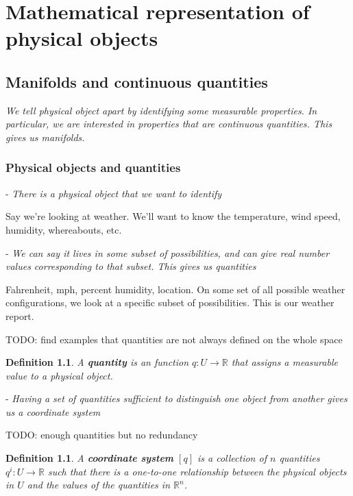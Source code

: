 \documentclass{book}
\newtheorem{defn}[equation]{Definition}
\begin{document}
\tableofcontents

\chapter{Mathematical representation of physical objects}



\section{Manifolds and continuous quantities}
\emph{We tell physical object apart by identifying some measurable properties. In particular, we are interested in properties that are continuous quantities. This gives us manifolds.}

\subsection{Physical objects and quantities}

- \emph{There is a physical object that we want to identify}

Say we're looking at weather. We'll want to know the temperature, wind speed, humidity, whereabouts, etc.

- \emph{We can say it lives in some subset of possibilities, and can give real number values corresponding to that subset. This gives us quantities}

Fahrenheit, mph, percent humidity, location.
On some set of all possible weather configurations, we look at a specific subset of possibilities. This is our weather report.  

TODO: find examples that quantities are not always defined on the whole space





\begin{defn}
	A \textbf{quantity} is an function $q : U \to \mathbb{R}$ that assigns a measurable value to a physical object.
\end{defn}


- \emph{Having a set of quantities sufficient to distinguish one object from another gives us a coordinate system}

TODO: enough quantities but no redundancy




\begin{defn}
	A \textbf{coordinate system} $[q]$ is a collection of $n$ quantities $q^i : U \to \mathbb{R}$ such that there is a one-to-one relationship between the physical objects in $U$ and the values of the quantities in $\mathbb{R}^n$.
\end{defn}
\end{document}
